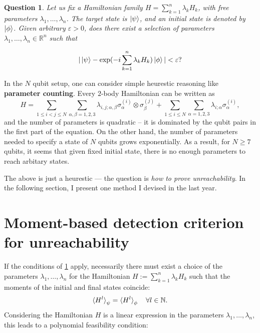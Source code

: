 \documentclass[ a4paper, 
                amsfonts, 
                amssymb, 
                amsmath, 
                reprint, 
                showkeys, 
                nofootinbib,
                superscriptaddress, 
                onecolumn, 
                notitlepage,
                aps,
                pra,
                longbibliography]{revtex4-1}
\newtheorem{question}{Question}
\theoremstyle{definition}
\newcommand{\bN}{{\mathbb{N}}}
\begin{document}
\begin{question}
Let us fix a Hamiltonian family $H=\sum_{k=1}^n \lambda_k H_k$, with free parameters $\lambda_1, \ldots, \lambda_n$. The target state is $\ket\psi$, and an initial state is denoted by $\ket\phi$. Given arbitrary $\varepsilon > 0$, does there exist a selection of parameters $\lambda_1, \ldots, \lambda_n \in \mathbb{R}^n$ such that

\begin{equation}
|\ket{\psi} - \exp(-i\sum_{k=1}^n \lambda_k H_k)\ket{\phi}| < \varepsilon?
\end{equation}
\label{q:act}
\end{question}
In the $N$ qubit setup, one can consider simple heurestic reasoning like \textbf{parameter counting}. Every $2$-body Hamiltonian can be written as 
\begin{equation}
H = \sum_{1\le i<j\le N} \sum_{\alpha,\beta=1,2,3} \lambda_{i,j;\alpha,\beta} \sigma_{\alpha}^{(i)} \otimes \sigma_{\beta}^{(j)} +  \sum_{1\le i \le N} \sum_{\alpha=1,2,3} \lambda_{i;\alpha} \sigma_{\alpha}^{(i)} ,\label{eq:nqbham}
\end{equation}
and the number of parameters is quadratic -- it is dominated by the qubit pairs in the first part of the equation. On the other hand, the number of parameters needed to specify a state of $N$ qubits grows exponentially. As a result, for $N \geq 7$ qubits, it seems that given fixed initial state, there is no enough parameters to reach arbitary states. 

The above is just a heurestic --- the question is \emph{how to prove unreachability}. In the following section, I present one method I devised in the last year.

\section{Moment-based detection {criterion for} unreachability}
If the conditions of \cref{q:act} apply, necessarily there must exist a choice of the parameters $\lambda_1, \ldots, \lambda_n$ for the Hamiltonian $H:=\sum_{k=1}^n \lambda_k H_k$ such that the moments of the initial and final states coincide:
\begin{equation}
\braket{H^l}_\psi = \braket{H^l}_\phi \quad \forall l \in \bN.
\end{equation}
Considering the Hamiltonian $H$ is a linear expression in the parameters $\lambda_1, \ldots, \lambda_n$, this leads to a polynomial feasibility condition:
\end{document}
